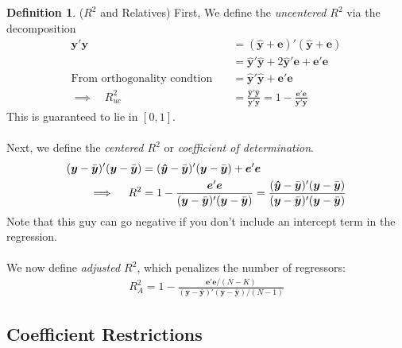 \documentclass[12pt]{article}
\theoremstyle{plain}
\theoremstyle{definition}
\newtheorem{defn}[thm]{Definition}
\theoremstyle{remark}
\newcommand{\bse}{\boldsymbol{e}}
\newcommand{\bshaty}{\boldsymbol{\hat{y}}}
\newcommand{\bsy}{\boldsymbol{y}}
\begin{document}
\begin{defn}($R^2$ and Relatives)
First, We define the \emph{uncentered $R^2$} via the decomposition
\begin{align*}
  \bsy' \bsy
  &=
  (\bshaty +\bse)'
  (\bshaty +\bse) \\
  &=
  \bshaty' \bshaty
  +2 \bshaty'\bse
  +\bse'\bse \\
  \text{From orthogonality condtion} \quad
  &=
  \bshaty' \bshaty
  +\bse'\bse \\
  \implies\quad
  R^2_{uc}
  &=
  \frac{\bshaty' \bshaty}{\bsy' \bsy}
  = 1- \frac{\bse'\bse}{\bsy' \bsy}
\end{align*}
This is guaranteed to lie in $[0,1]$.
\\
\\
Next, we define the \emph{centered $R^2$} or
\emph{coefficient of determination}.
\begin{align*}
  (\bsy-\bar{\bsy})'(\bsy-\bar{\bsy})
  &=
  (\bshaty-\bar{\bsy})'(\bsy-\bar{\bsy})
  +
  \bse'\bse \\
  \implies\quad
  R^2
  &=
  1-
  \frac{\bse'\bse}{(\bsy-\bar{\bsy})'(\bsy-\bar{\bsy})}
  =
  \frac{(\bshaty-\bar{\bsy})'(\bsy-\bar{\bsy})}{%
      (\bsy-\bar{\bsy})'(\bsy-\bar{\bsy})}
\end{align*}
Note that this guy can go negative if you don't include an intercept
term in the regression.
\\
\\
We now define \emph{adjusted $R^2$}, which penalizes the number of
regressors:
\begin{align*}
  R^2_A = 1 -
  \frac{\bse'\bse/(N-K)}{(\bsy-\bar{\bsy})'(\bsy-\bar{\bsy})/(N-1)}
\end{align*}
\end{defn}

\subsection{Coefficient Restrictions}
\end{document}
